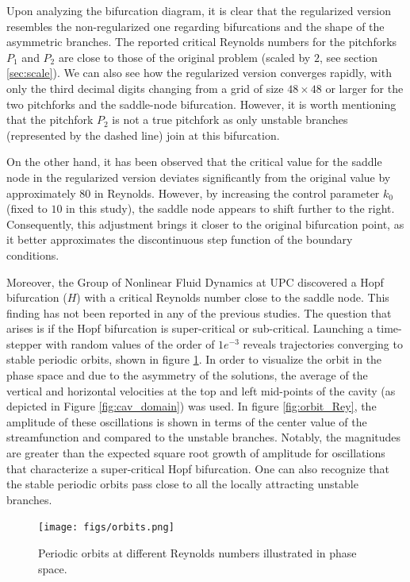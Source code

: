 Upon analyzing the bifurcation diagram, it is clear that the regularized
version resembles the non-regularized one regarding bifurcations and the shape
of the asymmetric branches. The reported critical Reynolds numbers for the
pitchforks $P_1$ and $P_2$ are close to those of the original problem (scaled
by $2$, see section \ref{sec:scale}). We can also see how the regularized
version converges rapidly, with only the third decimal digits changing from a
grid of size $48 \times 48$ or larger for the two pitchforks and the
saddle-node bifurcation. However, it is worth mentioning that the pitchfork
$P_2$ is not a true pitchfork as only unstable branches (represented by the
dashed line) join at this bifurcation.

On the other hand, it has been observed that the critical value for the saddle
node in the regularized version deviates significantly from the original value
by approximately $80$ in Reynolds. However, by increasing the control parameter
$k_0$ (fixed to $10$ in this study), the saddle node appears to shift further
to the right. Consequently, this adjustment brings it closer to the original
bifurcation point, as it better approximates the discontinuous step function of
the boundary conditions.

Moreover, the Group of Nonlinear Fluid Dynamics at UPC discovered a Hopf
bifurcation ($H$) with a critical Reynolds number close to the saddle node.
This finding has not been reported in any of the previous studies. The question
that arises is if the Hopf bifurcation is super-critical or sub-critical.
Launching a time-stepper with random values of the order of $1e^{-3}$ reveals
trajectories converging to stable periodic orbits, shown in figure
\ref{fig:orbit}. In order to visualize the orbit in the phase space and due to
the asymmetry of the solutions, the average of the vertical and horizontal
velocities at the top and left mid-points of the cavity (as depicted in Figure
\ref{fig:cav_domain}) was used. In figure \ref{fig:orbit_Rey}, the amplitude of
these oscillations is shown in terms of the center value of the streamfunction
and compared to the unstable branches. Notably, the magnitudes are greater than
the expected square root growth of amplitude for oscillations that characterize
a super-critical Hopf bifurcation. One can also recognize that the stable
periodic orbits pass close to all the locally attracting unstable branches.

\begin{figure}[ht]
  \centering
  \texttt{[image: figs/orbits.png]}
  \caption{Periodic orbits at different Reynolds numbers illustrated in phase space.} 
  \label{fig:orbit}
\end{figure}


